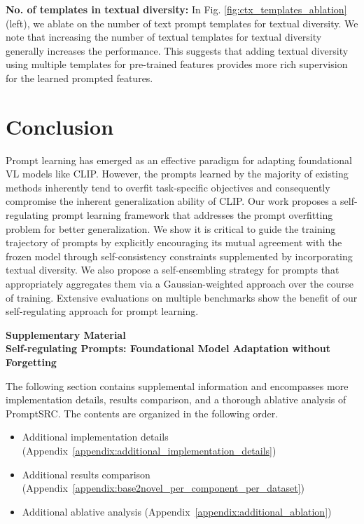 \documentclass[10pt,twocolumn,letterpaper]{article}
\begin{document}
\noindent \textbf{No. of templates in textual diversity:}
In Fig. \ref{fig:ctx_templates_ablation} (left), we ablate on the number of text prompt templates for textual diversity. We note that increasing the number of textual templates for textual diversity generally increases the performance. This suggests that adding textual diversity using multiple templates for pre-trained features provides more rich supervision for the learned prompted features.

\section{Conclusion}\vspace{-0.5em}
Prompt learning has emerged as an effective paradigm for adapting foundational VL models like CLIP. However, the prompts learned by the majority of existing methods inherently tend to overfit task-specific objectives and consequently compromise the inherent generalization ability of CLIP. Our work proposes a self-regulating prompt learning framework that addresses the prompt overfitting problem for better generalization. We show it is critical to guide the training trajectory of prompts by explicitly encouraging its mutual agreement with the frozen model through self-consistency constraints supplemented by incorporating textual diversity. We also propose a self-ensembling strategy for prompts that appropriately aggregates them via a Gaussian-weighted approach over the course of training. Extensive evaluations on multiple benchmarks show the benefit of our self-regulating approach for prompt learning.

{\small


}

\newpage

\appendix





\begin{center}
\textbf{{\Large Supplementary Material}\\[0.5em]
{\large Self-regulating Prompts: Foundational Model Adaptation without Forgetting}
}
\end{center}\vspace{1em}

The following section contains supplemental information and encompasses more implementation details, results comparison, and a thorough ablative analysis of PromptSRC. The contents are organized in the following order.
\begin{itemize}
    \item Additional implementation details (Appendix~\ref{appendix:additional_implementation_details})
    \item Additional results comparison (Appendix~\ref{appendix:base2novel_per_component_per_dataset})
    \item Additional ablative analysis (Appendix~\ref{appendix:additional_ablation})
\end{itemize}
\end{document}
